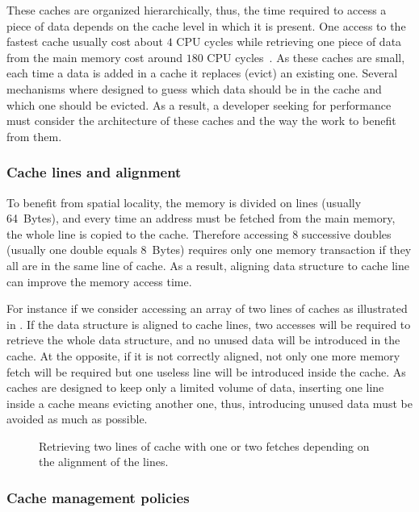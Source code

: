 These caches are organized hierarchically, thus, the time required to access a piece of data depends on the cache level in which it is present.
One access to the fastest cache usually cost about $4$ \gls{CPU} cycles while retrieving one piece of data from the main memory cost around $180$ \gls{CPU} cycles~\cite{Levinthal09Performance}.
As these caches are small, each time a data is added in a cache it replaces (evict) an existing one.
Several mechanisms where designed to guess which data should be in the cache and which one should be evicted.
As a result, a developer seeking for performance must consider the architecture of these caches and the way the work to benefit from them.

\subsubsection{Cache lines and alignment}

To benefit from spatial locality, the memory is divided on lines (usually \SI{64}{Bytes}), and every time an address must be fetched from the main memory, the whole line is copied to the cache.
Therefore accessing $8$ successive doubles (usually one double equals \SI{8}{Bytes}) requires only one memory transaction if they all are in the same line of cache.
As a result, aligning data structure to cache line can improve the memory access time.

For instance if we consider accessing an array of two lines of caches as illustrated in .
If the data structure is aligned to cache lines, two accesses will be required to retrieve the whole data structure, and no unused data will be introduced in the cache.
At the opposite, if it is not correctly aligned, not only one more memory fetch will be required but one useless line will be introduced inside the cache.
As caches are designed to keep only a limited volume of data, inserting one line inside a cache means evicting another one, thus, introducing unused data must be avoided as much as possible.

\begin{figure}[htb]
    \centering
    
    \caption[Example of bad alignment.]{Retrieving two lines of cache with one or two fetches depending on the alignment of the lines.}
    \label{fig:bad-align}
\end{figure}

\subsubsection{Cache management policies}

